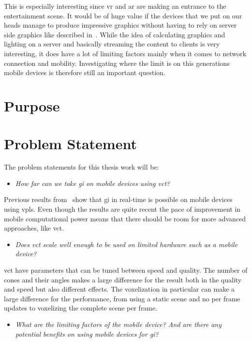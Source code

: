 This is especially interesting since \gls{vr} and \gls{ar} are making an entrance to the entertainment scene. It would be of huge value if the devices that we put on our heads manage to produce impressive graphics without having to rely on server side graphics like described in~\cite{cloudlight}. While the idea of calculating graphics and lighting on a server and basically streaming the content to clients is very interesting, it does have a lot of limiting factors mainly when it comes to network connection and mobility. Investigating where the limit is on this generations mobile devices is therefore still an important question.

\section{Purpose}

\section{Problem Statement}

The problem statements for this thesis work will be:

\begin{itemize}
  \item \textit{How far can we take \gls{gi} on mobile devices using \gls{vct}?}
\end{itemize}

Previous results from~\cite{gimobile} show that \gls{gi} in real-time is possible on mobile devices using \glspl{vpl}. Even though the results are quite recent the pace of improvement in mobile computational power means that there should be room for more advanced approaches, like \gls{vct}.

\begin{itemize}
  \item \textit{Does \gls{vct} scale well enough to be used on limited hardware such as a mobile device?}
\end{itemize}

\gls{vct} have parameters that can be tuned between speed and quality. The number of cones and their angles makes a large difference for the result both in the quality and speed but also different effects. The voxelization in particular can make a large difference for the performance, from using a static scene and no per frame updates to voxelizing the complete scene per frame.

\begin{itemize}
  \item \textit{What are the limiting factors of the mobile device? And are there any potential benefits on using mobile devices for \gls{gi}?}
\end{itemize}

